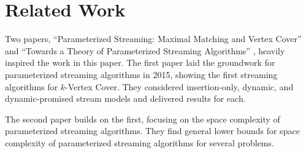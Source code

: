 \section{Related Work}

Two papers, ``Parameterized Streaming: Maximal Matching and Vertex Cover''
\cite{chitnis2015parameterized} and ``Towards a Theory of Parameterized
Streaming Algorithms'' \cite{chitnis2019towards}, heavily inspired the work in
this paper. The first paper laid the groundwork for parameterized streaming
algorithms in 2015, showing the first streaming algorithms for \(k\)-Vertex
Cover. They considered insertion-only, dynamic, and dynamic-promised stream
models and delivered results for each.

The second paper builds on the first, focusing on the space complexity of
parameterized streaming algorithms. They find general lower bounds for space
complexity of parameterized streaming algorithms for several problems.